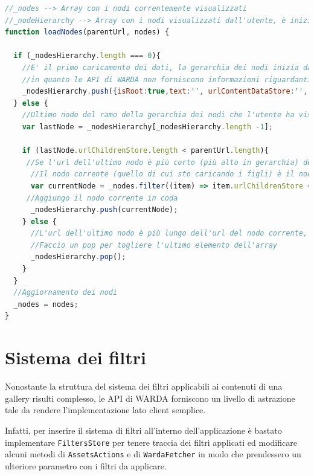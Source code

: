 \begin{lstlisting}[language=JavaScript, caption=NodesStore - Caricamento dei nodi]
//_nodes --> Array con i nodi correntemente visualizzati
//_nodeHierarchy --> Array con i nodi visualizzati dall'utente, è inizializzato come array vuoto
function loadNodes(parentUrl, nodes) {

  if (_nodesHierarchy.length === 0){
    //E' il primo caricamento dei dati, la gerarchia dei nodi inizia da un nodo "finto" che funziona da radice
    //in quanto le API di WARDA non forniscono informazioni riguardanti il nodo radice di una gallery
    _nodesHierarchy.push({isRoot:true,text:'', urlContentDataStore:'', urlChildrenStore:''});
  } else {
    //Ultimo nodo del ramo della gerarchia dei nodi che l'utente ha visualizzato
    var lastNode = _nodesHierarchy[_nodesHierarchy.length -1];

    if (lastNode.urlChildrenStore.length < parentUrl.length){
     //Se l'url dell'ultimo nodo è più corto (più alto in gerarchia) dell'url del nodo corrente, vuol dire che l'utente sta scendendo lungo il ramo
      //Il nodo corrente (quello di cui sto caricando i figli) è il nodo che ha urlContentDataStore == parentUrl e che si trova correntemente in memoria
      var currentNode = _nodes.filter((item) => item.urlChildrenStore === parentUrl)[0];
     //Aggiungo il nodo corrente in coda
      _nodesHierarchy.push(currentNode);
    } else {
      //L'url dell'ultimo nodo è più lungo dell'url del nodo corrente, vuol dire che sto risalendo lungo il ramo
      //Faccio un pop per togliere l'ultimo elemento dell'array
      _nodesHierarchy.pop();
    }
  }
  //Aggiornamento dei nodi
  _nodes = nodes;
}
\end{lstlisting}


\section{Sistema dei filtri}

Nonostante la struttura del sistema dei filtri applicabili ai contenuti di una gallery risulti complesso, le API di WARDA forniscono un livello di astrazione tale da rendere l'implementazione lato client semplice.

Infatti, per inserire il sistema di filtri all'interno dell'applicazione è bastato implementare \texttt{FiltersStore} per tenere traccia dei filtri applicati ed modificare alcuni metodi di \texttt{AssetsActions} e di \texttt{WardaFetcher} in modo che prendessero un ulteriore parametro con i filtri da applicare.

